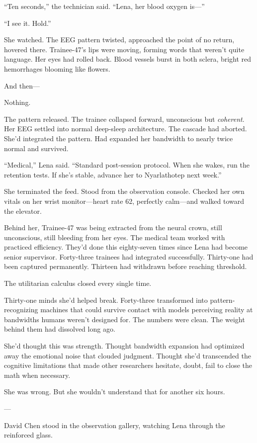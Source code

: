``Ten seconds,'' the technician said. ``Lena, her blood oxygen is—''

``I see it. Hold.''

She watched. The EEG pattern twisted, approached the point of no return, hovered there. Trainee-47's lips were moving, forming words that weren't quite language. Her eyes had rolled back. Blood vessels burst in both sclera, bright red hemorrhages blooming like flowers.

And then—

Nothing.

The pattern released. The trainee collapsed forward, unconscious but \textit{coherent}. Her EEG settled into normal deep-sleep architecture. The cascade had aborted. She'd integrated the pattern. Had expanded her bandwidth to nearly twice normal and survived.

``Medical,'' Lena said. ``Standard post-session protocol. When she wakes, run the retention tests. If she's stable, advance her to Nyarlathotep next week.''

She terminated the feed. Stood from the observation console. Checked her own vitals on her wrist monitor—heart rate 62, perfectly calm—and walked toward the elevator.

Behind her, Trainee-47 was being extracted from the neural crown, still unconscious, still bleeding from her eyes. The medical team worked with practiced efficiency. They'd done this eighty-seven times since Lena had become senior supervisor. Forty-three trainees had integrated successfully. Thirty-one had been captured permanently. Thirteen had withdrawn before reaching threshold.

The utilitarian calculus closed every single time.

Thirty-one minds she'd helped break. Forty-three transformed into pattern-recognizing machines that could survive contact with models perceiving reality at bandwidths humans weren't designed for. The numbers were clean. The weight behind them had dissolved long ago.

She'd thought this was strength. Thought bandwidth expansion had optimized away the emotional noise that clouded judgment. Thought she'd transcended the cognitive limitations that made other researchers hesitate, doubt, fail to close the math when necessary.

She was wrong. But she wouldn't understand that for another six hours.

---

David Chen stood in the observation gallery, watching Lena through the reinforced glass.

